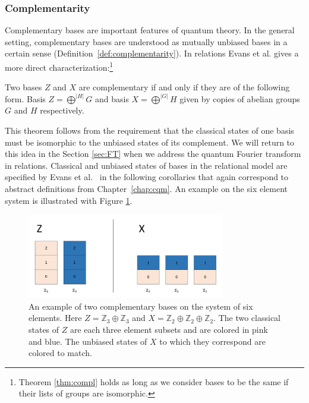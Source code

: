 \subsubsection*{Complementarity}
Complementary bases are important features of quantum theory. In the general setting, complementary bases are understood as mutually unbiased bases in a certain sense (Definition~\ref{def:complementarity}).  In relations Evans et al. gives a more direct characterization:\footnote{Theorem \ref{thm:compl} holds as long as we consider bases to be the same if their lists of groups are isomorphic.}
\begin{theorem}
\label{thm:compl}
Two bases $Z$ and $X$ are complementary if and only if they are of the following form. Basis $Z = \bigoplus^{|H|}G$ and basis $X = \bigoplus^{|G|}H$ given by copies of abelian groups $G$ and $H$ respectively.
\end{theorem}

This theorem follows from the requirement that the classical states of one basis must be isomorphic to the unbiased states of its complement. We will return to this idea in the Section \ref{sec:FT} when we address the quantum Fourier transform in relations. Classical and unbiased states of bases in the relational model are specified by Evans et al.~\cite{evans2009classifying} in the following corollaries that again correspond to abstract definitions from Chapter~\ref{chap:cqm}. An example on the six element system is illustrated with Figure \ref{complEx}.

\begin{figure}[tb]
\begin{center}
\includegraphics[height=10em,natwidth=1091,natheight=468,scale=1]{images/complexample.png}
\end{center}
\vspace{-14pt}
\caption[An example of two complementary bases on the system of six elements.]{An example of two complementary bases on the system of six elements. Here $Z=\mathbb{Z}_3\oplus\mathbb{Z}_3$ and $X = \mathbb{Z}_2\oplus\mathbb{Z}_2\oplus \mathbb{Z}_2$.  The two classical states of $Z$ are each three element subsets and are colored in pink and blue. The unbiased states of $X$ to which they correspond are colored to match.
}
\label{complEx}
\end{figure}

